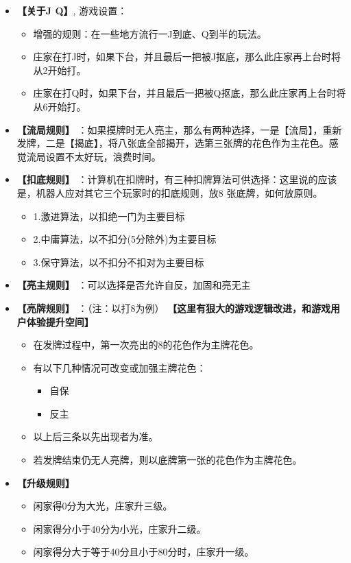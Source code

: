 \documentclass[9pt, b5paper]{article}
\begin{document}
\begin{itemize}
\item \textbf{【关于J Q】}, 游戏设置： 
\begin{itemize}
\item 增强的规则：在一些地方流行一J到底、Q到半的玩法。
\item 庄家在打J时，如果下台，并且最后一把被J抠底，那么此庄家再上台时将从2开始打。
\item 庄家在打Q时，如果下台，并且最后一把被Q抠底，那么此庄家再上台时将从6开始打。
\end{itemize}
\item \textbf{【流局规则】} ：如果摸牌时无人亮主，那么有两种选择，一是【流局】，重新发牌，二是【揭底】，将八张底全部揭开，选第三张牌的花色作为主花色。感觉流局设置不太好玩，浪费时间。
\item \textbf{【扣底规则】} ：计算机在扣牌时，有三种扣牌算法可供选择：这里说的应该是，机器人应对其它三个玩家时的扣底规则，放8 张底牌，如何放原则。
\begin{itemize}
\item 1.激进算法，以扣绝一门为主要目标
\item 2.中庸算法，以不扣分(5分除外)为主要目标
\item 3.保守算法，以不扣分不扣对为主要目标
\end{itemize}
\item \textbf{【亮主规则】} ：可以选择是否允许自反，加固和亮无主
\item \textbf{【亮牌规则】} ：（注：以打8为例） \textbf{【这里有狠大的游戏逻辑改进，和游戏用户体验提升空间】}
\begin{itemize}
\item 在发牌过程中，第一次亮出的8的花色作为主牌花色。
\item 有以下几种情况可改变或加强主牌花色：
\begin{itemize}
\item 自保
\item 反主
\end{itemize}
\item 以上后三条以先出现者为准。
\item 若发牌结束仍无人亮牌，则以底牌第一张的花色作为主牌花色。
\end{itemize}
\item \textbf{【升级规则】}
\begin{itemize}
\item 闲家得0分为大光，庄家升三级。
\item 闲家得分小于40分为小光，庄家升二级。
\item 闲家得分大于等于40分且小于80分时，庄家升一级。

\end{itemize}
\end{itemize}
\end{document}
